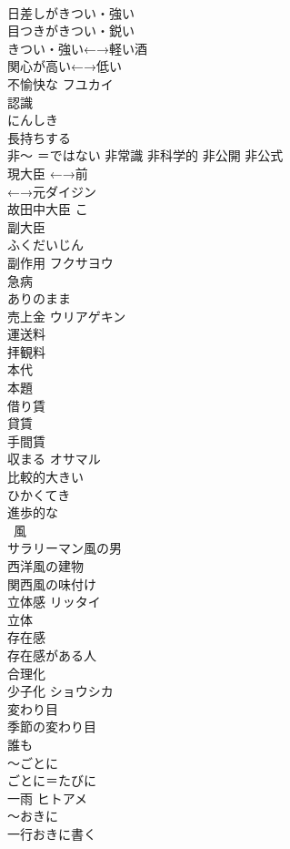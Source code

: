 \documentclass[8pt]{extreport}
\begin{document}
\begin{CJK}{UTF8}{min}
\\	日差しがきつい・強い	
\\	目つきがきつい・鋭い	
\\	きつい・強い←→軽い酒	
\\	関心が高い←→低い	
\\	不愉快な	フユカイ
\\	認識	
\\	にんしき
\\	長持ちする	
\\	非〜 ＝ではない 非常識 非科学的 非公開 非公式	
\\	現大臣	←→前 
\\	←→元ダイジン 
\\	故田中大臣	こ 
\\	副大臣	
\\	ふくだいじん
\\	副作用	フクサヨウ 
\\	急病	
\\	ありのまま	
\\	売上金	ウリアゲキン 
\\	運送料	
\\	拝観料	
\\	本代	
\\	本題	
\\	借り賃	
\\	貸賃	
\\	手間賃	
\\	収まる	オサマル 
\\	比較的大きい	
\\	ひかくてき
\\	進歩的な	
\\	~風	
\\	サラリーマン風の男 
\\	西洋風の建物 
\\	関西風の味付け 
\\	立体感	リッタイ 
\\	立体 
\\	存在感	
\\	存在感がある人 
\\	合理化	
\\	少子化	ショウシカ 
\\	変わり目	
\\	季節の変わり目 
\\	誰も	
\\	〜ごとに	
\\	ごとに＝たびに
\\	一雨	ヒトアメ 
\\	〜おきに	
\\	一行おきに書く 

\end{CJK}
\end{document}
